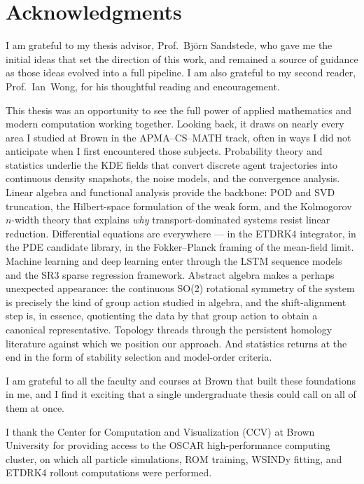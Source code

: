\section*{Acknowledgments}

I am grateful to my thesis advisor, Prof.\ Bj\"orn Sandstede, who gave me
the initial ideas that set the direction of this work, and remained a source
of guidance as those ideas evolved into a full pipeline.
I am also grateful to my second reader, Prof.\ Ian~Wong, for his thoughtful
reading and encouragement.

This thesis was an opportunity to see the full power of applied mathematics
and modern computation working together.
Looking back, it draws on nearly every area I studied at Brown in the
APMA--CS--MATH track, often in ways I did not anticipate when I
first encountered those subjects.
Probability theory and statistics underlie the KDE fields that convert
discrete agent trajectories into continuous density snapshots, the noise
models, and the convergence analysis.
Linear algebra and functional analysis provide the backbone: POD and
SVD truncation, the Hilbert-space formulation of the weak form, and the
Kolmogorov $n$-width theory that explains \emph{why} transport-dominated
systems resist linear reduction.
Differential equations are everywhere --- in the ETDRK4 integrator, in
the PDE candidate library, in the Fokker--Planck framing of the mean-field
limit.
Machine learning and deep learning enter through the LSTM sequence models
and the SR3 sparse regression framework.
Abstract algebra makes a perhaps unexpected appearance: the continuous
SO(2) rotational symmetry of the system is precisely the kind of group
action studied in algebra, and the shift-alignment step is, in essence,
quotienting the data by that group action to obtain a canonical
representative.
Topology threads through the persistent homology literature against which
we position our approach.
And statistics returns at the end in the form of stability selection and
model-order criteria.

I am grateful to all the faculty and courses at Brown that built these
foundations in me, and I find it exciting that a single
undergraduate thesis could call on all of them at once.


I thank the Center for Computation and Visualization
(CCV) at Brown University for providing access to
the OSCAR high-performance computing
cluster, on which all particle simulations,
ROM training, WSINDy fitting, and ETDRK4 rollout computations were
performed.
